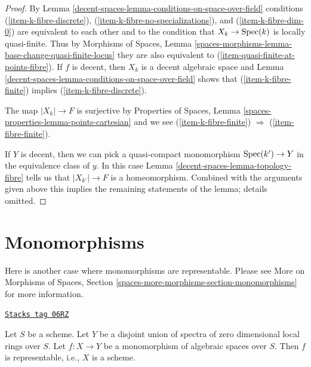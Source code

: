 \begin{proof}
By Lemma \ref{decent-spaces-lemma-conditions-on-space-over-field}
conditions  (\ref{item-k-fibre-discrete}),
(\ref{item-k-fibre-no-specializations}), and (\ref{item-k-fibre-dim-0})
are equivalent to each other and to the condition that
$X_k \to \operatorname{Spec}(k)$ is locally quasi-finite.
Thus by Morphisms of Spaces, Lemma
\ref{spaces-morphisms-lemma-base-change-quasi-finite-locus}
they are also equivalent to (\ref{item-quasi-finite-at-points-fibre}).
If $f$ is decent, then $X_k$ is a decent algebraic space and
Lemma \ref{decent-spaces-lemma-conditions-on-space-over-field}
shows that (\ref{item-k-fibre-finite}) implies (\ref{item-k-fibre-discrete}).

\medskip\noindent
The map $|X_k| \to F$ is surjective by
Properties of Spaces, Lemma \ref{spaces-properties-lemma-points-cartesian}
and we see
(\ref{item-k-fibre-finite}) $\Rightarrow$ (\ref{item-fibre-finite}).

\medskip\noindent
If $Y$ is decent, then we can pick a quasi-compact monomorphism
$\operatorname{Spec}(k') \to Y$ in the equivalence class of $y$. In this case
Lemma \ref{decent-spaces-lemma-topology-fibre}
tells us that $|X_{k'}| \to F$ is a homeomorphism.
Combined with the arguments given above this implies
the remaining statements of the lemma; details omitted.
\end{proof}

\section{Monomorphisms}
\label{decent-spaces-section-monomorphisms}
Here is another case where monomorphisms are representable.
Please see More on Morphisms of Spaces, Section
\ref{spaces-more-morphisms-section-monomorphisms}
for more information.

\begin{lemma}
\label{decent-spaces-lemma-monomorphism-toward-disjoint-union-dim-0-rings}
\href{https://stacks.math.columbia.edu/tag/06RZ}{\texttt{Stacks tag 06RZ}}

Let $S$ be a scheme. Let $Y$ be a disjoint union of spectra of
zero dimensional local rings over $S$.
Let $f : X \to Y$ be a monomorphism of algebraic spaces over $S$.
Then $f$ is representable, i.e., $X$ is a scheme.
\end{lemma}

